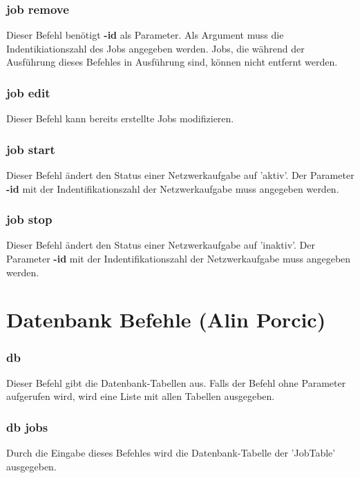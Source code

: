\documentclass[12pt,a4paper]{report}
\begin{document}
\begin{onehalfspace}
\subsubsection{job remove}

Dieser Befehl benötigt \textbf{-id} als Parameter. Als Argument muss die Indentikiationszahl des Jobs angegeben werden. Jobs, die während der Ausführung dieses Befehles in Ausführung sind, können nicht entfernt werden.

\subsubsection{job edit}

Dieser Befehl kann bereits erstellte Jobs modifizieren. 

\subsubsection{job start}

Dieser Befehl ändert den Status einer Netzwerkaufgabe auf 'aktiv'. Der Parameter \textbf{-id} mit der Indentifikationszahl der Netzwerkaufgabe muss angegeben werden.

\subsubsection{job stop}

Dieser Befehl ändert den Status einer Netzwerkaufgabe auf 'inaktiv'. Der Parameter \textbf{-id} mit der Indentifikationszahl der Netzwerkaufgabe muss angegeben werden.

\section{Datenbank Befehle (Alin Porcic)}

\subsubsection{db}

Dieser Befehl gibt die Datenbank-Tabellen aus. Falls der Befehl ohne Parameter aufgerufen wird, wird eine Liste mit allen Tabellen ausgegeben.

\subsubsection{db jobs}

Durch die Eingabe dieses Befehles wird die Datenbank-Tabelle der 'JobTable' ausgegeben.


\end{onehalfspace}
\end{document}
